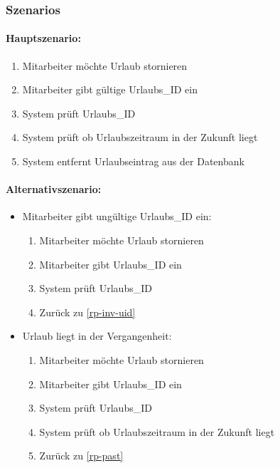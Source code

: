 \subsubsection{Szenarios}
\paragraph{Hauptszenario:}

\begin{enumerate}
    \item Mitarbeiter möchte Urlaub stornieren
	\item Mitarbeiter gibt gültige Urlaubs\_ID ein
	\item System prüft Urlaubs\_ID
	\item System prüft ob Urlaubszeitraum in der Zukunft liegt
	\item System entfernt Urlaubseintrag aus der Datenbank
\end{enumerate}

\paragraph{Alternativszenario:}

\begin{itemize}
    \item Mitarbeiter gibt ungültige Urlaubs\_ID ein:
    \begin{enumerate}
    	\item Mitarbeiter möchte Urlaub stornieren
    	\item Mitarbeiter gibt Urlaubs\_ID ein \label{rp-inv-uid}
    	\item System prüft Urlaubs\_ID
    	\item Zurück zu \ref{rp-inv-uid}
    \end{enumerate}
    
    \item Urlaub liegt in der Vergangenheit:
     \begin{enumerate}
    	\item Mitarbeiter möchte Urlaub stornieren
    	\item Mitarbeiter gibt Urlaubs\_ID ein \label{rp-past}
    	\item System prüft Urlaubs\_ID
    	\item System prüft ob Urlaubszeitraum in der Zukunft liegt
    	\item Zurück zu \ref{rp-past}
    \end{enumerate}   
\end{itemize}

